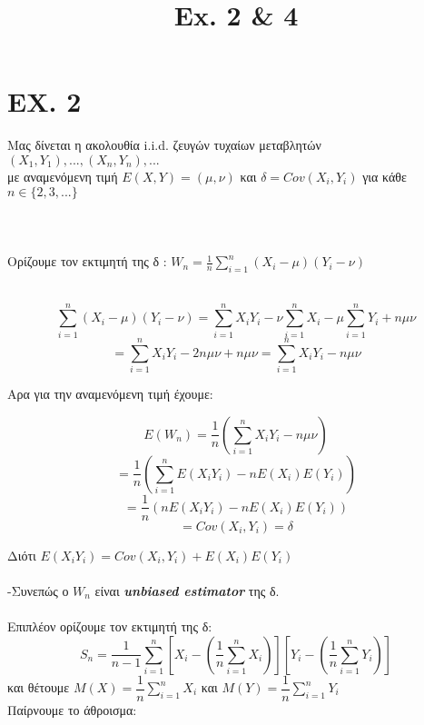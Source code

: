 \documentclass{article}
\begin{document}
\title{Ex. 2 \& 4}
\maketitle

\section*{EX. 2}

Μας δίνεται η ακολουθία i.i.d. ζευγών τυχαίων μεταβλητών $(X_{1},Y_{1}),...,(X_{n},Y_{n}),...$ \\
με αναμενόμενη τιμή $E(X,Y)=(μ,ν)$ και $δ=Cov(X_{i},Y_{i})$ για κάθε $ n\in\lbrace 2,3,...\rbrace$
\\
\\
\\
\\
Ορίζουμε τον εκτιμητή της δ : $W_{n}=\frac{1}{n}\sum_{i=1}^{n}(X_{i}-\mu)(Y_{i}-\nu)$ \\\\
\begin{center}
$$
\sum_{i=1}^{n}(X_{i}-\mu)(Y_{i}-\nu)=\sum_{i=1}^{n}X_{i}Y_{i}-\nu\sum_{i=1}^{n}X_{i}
-\mu\sum_{i=1}^{n}Y_{i}+n\mu\nu 
$$
$$
=\sum_{i=1}^{n}X_{i}Y_{i}-2n\mu\nu+n\mu\nu=\sum_{i=1}^{n}X_{i}Y_{i}-n\mu\nu 
$$\label{1} 


\end{center}

Αρα για την αναμενόμενη τιμή έχουμε:
\begin{center}
$$
E(W_{n})=\dfrac{1}{n}(\sum_{i=1}^{n}X_{i}Y_{i}-n\mu\nu)
$$
$$
=\dfrac{1}{n}(\sum_{i=1}^{n}E(X_{i}Y_{i})-nE(X_{i})E(Y_{i}))
$$
$$
=\dfrac{1}{n}(nE(X_{i}Y_{i})-nE(X_{i})E(Y_{i}))
$$
$$
=Cov(X_{i},Y_{i})=\delta
$$
\end{center}
Διότι $E(X_{i}Y_{i})=Cov(X_{i},Y_{i})+E(X_{i})E(Y_{i})$
\\
\\
-Συνεπώς ο $W_{n}$ είναι \emph{\textbf{unbiased estimator}} της δ.



\paragraph{}
Επιπλέον ορίζουμε τον εκτιμητή της δ:
$$
S_{n}=\dfrac{1}{n-1}\sum_{i=1}^{n}[X_{i}-(\dfrac{1}{n}\sum_{i=1}^{n}X_{i})][Y_{i}-(\dfrac{1}{n}\sum_{i=1}^{n}Y_{i})]
$$
και θέτουμε \emph{$M(X)=\dfrac{1}{n}\sum_{i=1}^{n}X_{i}$} και \emph{$M(Y)=\dfrac{1}{n}\sum_{i=1}^{n}Y_{i}$}
\\
Παίρνουμε το άθροισμα:
\end{document}
